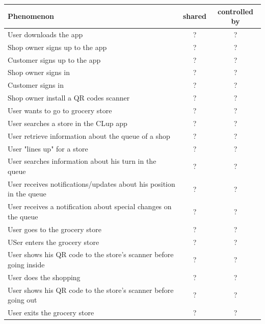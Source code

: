 \begin{tabular}{|l|c|c|}
    \hline
    \textbf{Phenomenon} & \textbf{shared} & \textbf{controlled by}\\
    \hline
    User downloads the app & ? & ? \\
    Shop owner signs up to the app & ? & ? \\
    Customer signs up to the app & ? & ? \\
    Shop owner signs in & ? & ? \\
    Customer signs in & ? & ? \\
    Shop owner install a QR codes scanner & ? & ? \\
    \hline
    User wants to go to grocery store & ? & ? \\
    User searches a store in the CLup app & ? & ? \\
    User retrieve information about the queue of a shop & ? & ? \\
    User "lines up" for a store & ? & ? \\
    User searches information about his turn in the queue & ? & ? \\
    User receives notifications/updates about his position in the queue & ? & ? \\
    User receives a notification about special changes on the queue & ? & ? \\ %
    User goes to the grocery store & ? & ? \\
    USer enters the grocery store & ? & ? \\
    User shows his QR code to the store's scanner before going inside & ? & ? \\
    User does the shopping & ? & ? \\
    User shows his QR code to the store's scanner before going out & ? & ? \\
    User exits the grocery store & ? & ? \\

\end{tabular}
